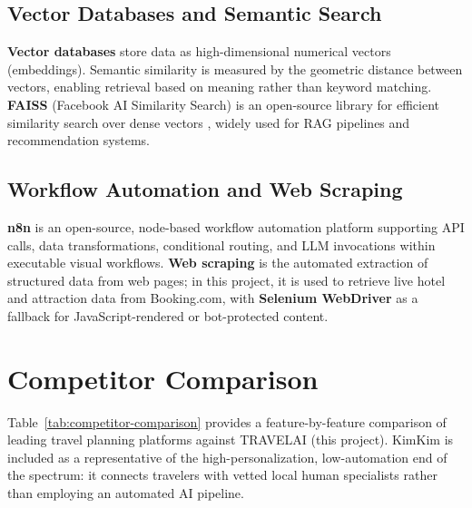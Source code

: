 \documentclass[12pt,a4paper]{report}
\begin{document}
\subsection{Vector Databases and Semantic Search}

\textbf{Vector databases} store data as high-dimensional numerical vectors (embeddings). Semantic
similarity is measured by the geometric distance between vectors, enabling retrieval based on meaning
rather than keyword matching. \textbf{FAISS} (Facebook AI Similarity Search) is an open-source
library for efficient similarity search over dense vectors \cite{johnson2019faiss}, widely used for
RAG pipelines and recommendation systems.

\subsection{Workflow Automation and Web Scraping}

\textbf{n8n} is an open-source, node-based workflow automation platform supporting API calls, data
transformations, conditional routing, and LLM invocations within executable visual workflows.
\textbf{Web scraping} is the automated extraction of structured data from web pages; in this project,
it is used to retrieve live hotel and attraction data from Booking.com, with \textbf{Selenium
WebDriver} as a fallback for JavaScript-rendered or bot-protected content.

\section{Competitor Comparison}

Table~\ref{tab:competitor-comparison} provides a feature-by-feature comparison of leading travel
planning platforms against TRAVELAI (this project). KimKim is included as a representative of the
high-personalization, low-automation end of the spectrum: it connects travelers with vetted local
human specialists rather than employing an automated AI pipeline.
\end{document}
